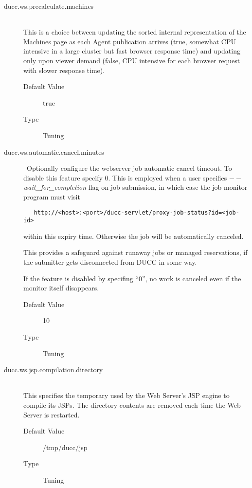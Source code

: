 \begin{description}
        \item[ducc.ws.precalculate.machines] \hfill \\
          This is a choice between updating the sorted internal representation of the 
          Machines page as each Agent publication arrives (true, somewhat CPU intensive
          in a large cluster but fast browser response time) and updating only upon viewer 
          demand (false, CPU intensive for each browser request with slower response time).
          \begin{description}
            \item[Default Value] true
            \item[Type] Tuning
          \end{description}
            
        \item[ducc.ws.automatic.cancel.minutes] \hfill \ Optionally configure the webserver job
          automatic cancel timeout. To disable this feature specify 0.  This is employed when a user
          specifies {\em$--$wait\_for\_completion} flag on job submission, in which case the job
          monitor program must visit 
\begin{verbatim}
   http://<host>:<port>/ducc-servlet/proxy-job-status?id=<job-id>
\end{verbatim}
          within this expiry time.  Otherwise the job will be automatically canceled.

          This provides a safeguard against runaway jobs or managed reservations, if the
          submitter gets disconnected from DUCC in some way.

          If the feature is disabled by specifing ``0'', no work is canceled even if the
          monitor itself disappears.

          \begin{description}
            \item[Default Value] 10
            \item[Type] Tuning
          \end{description}

        \item[ducc.ws.jsp.compilation.directory] \hfill \\
          This specifies the temporary used by the Web Server's JSP engine to compile its JSPs.
          The directory contents are removed each time the Web Server is restarted.
          \begin{description}
            \item[Default Value] /tmp/ducc/jsp
            \item[Type] Tuning
          \end{description}


\end{description}
